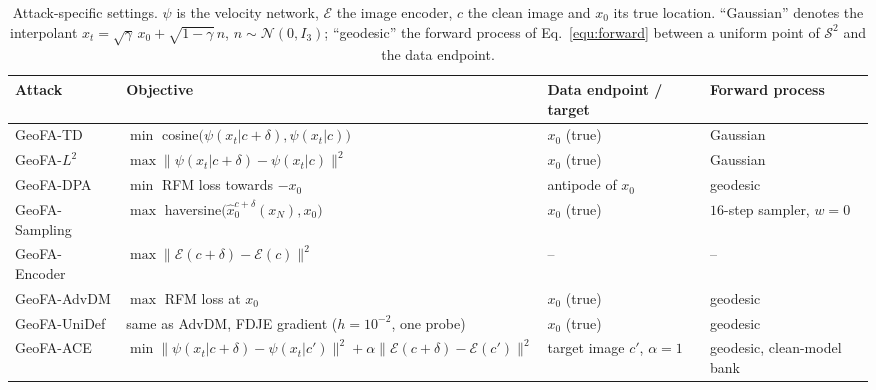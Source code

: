 \begin{table}[h]
\centering\small\setlength{\tabcolsep}{5pt}
\caption{Attack-specific settings. $\psi$ is the velocity network, $\mathcal{E}$ the image
encoder, $c$ the clean image and $x_0$ its true location. ``Gaussian'' denotes the interpolant
$x_t = \sqrt{\gamma}\,x_0 + \sqrt{1-\gamma}\,n$, $n \sim \mathcal{N}(0, I_3)$; ``geodesic'' the
forward process of Eq.~\ref{equ:forward} between a uniform point of $\mathcal{S}^2$ and the
data endpoint.}
\label{tab:hyperparams-specific}
\begin{tabular}{llll}
\toprule
Attack & Objective & Data endpoint / target & Forward process \\
\midrule
GeoFA-TD       & $\min$ cosine$\big(\psi(x_t|c+\delta), \psi(x_t|c)\big)$       & $x_0$ (true)            & Gaussian \\
GeoFA-$L^2$    & $\max \lVert \psi(x_t|c+\delta) - \psi(x_t|c) \rVert^2$        & $x_0$ (true)            & Gaussian \\
GeoFA-DPA      & $\min$ RFM loss towards $-x_0$                                 & antipode of $x_0$       & geodesic \\
GeoFA-Sampling & $\max$ haversine$\big(\hat{x}_0^{c+\delta}(x_N), x_0\big)$     & $x_0$ (true)            & $16$-step sampler, $w{=}0$ \\
GeoFA-Encoder  & $\max \lVert \mathcal{E}(c+\delta) - \mathcal{E}(c) \rVert^2$  & --                      & -- \\
GeoFA-AdvDM    & $\max$ RFM loss at $x_0$                                       & $x_0$ (true)            & geodesic \\
GeoFA-UniDef   & same as AdvDM, FDJE gradient ($h = 10^{-2}$, one probe)        & $x_0$ (true)            & geodesic \\
GeoFA-ACE      & $\min \lVert \psi(x_t|c+\delta) - \psi(x_t|c') \rVert^2 + \alpha \lVert \mathcal{E}(c+\delta) - \mathcal{E}(c') \rVert^2$ & target image $c'$, $\alpha = 1$ & geodesic, clean-model bank \\
\bottomrule
\end{tabular}
\end{table}

